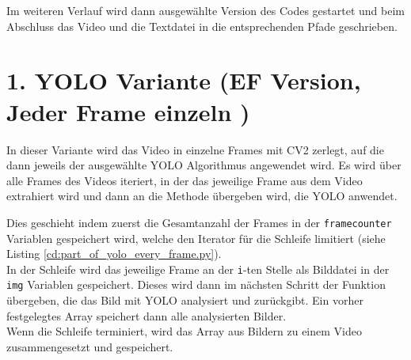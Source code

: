 {	Im weiteren Verlauf wird dann ausgewählte Version des Codes gestartet und beim Abschluss das Video und die Textdatei in die entsprechenden Pfade geschrieben.
}



\section{1. YOLO Variante (EF Version, Jeder Frame einzeln )} {
	\label{py:YOLO_every_frame}
	In dieser Variante wird das Video in einzelne Frames mit CV2 zerlegt, auf die dann jeweils der ausgewählte YOLO Algorithmus angewendet wird. 
	Es wird über alle Frames des Videos iteriert, in der das jeweilige Frame aus dem Video extrahiert wird und dann an die Methode übergeben wird, die YOLO anwendet.
	
	Dies geschieht indem zuerst die Gesamtanzahl der Frames in der \lstinline|framecounter| Variablen gespeichert wird, welche den Iterator für die Schleife limitiert (siehe Listing \ref{cd:part_of_yolo_every_frame.py}). \\ 
	In der Schleife wird das jeweilige Frame an der \lstinline|i|-ten Stelle als Bilddatei in der \lstinline|img| Variablen gespeichert. Dieses wird dann im nächsten Schritt der Funktion übergeben, die das Bild mit YOLO analysiert und zurückgibt. Ein vorher festgelegtes Array speichert dann alle analysierten Bilder. \\ 
	Wenn die Schleife terminiert, wird das Array aus Bildern zu einem Video zusammengesetzt und gespeichert. \\

	
	
	
}
